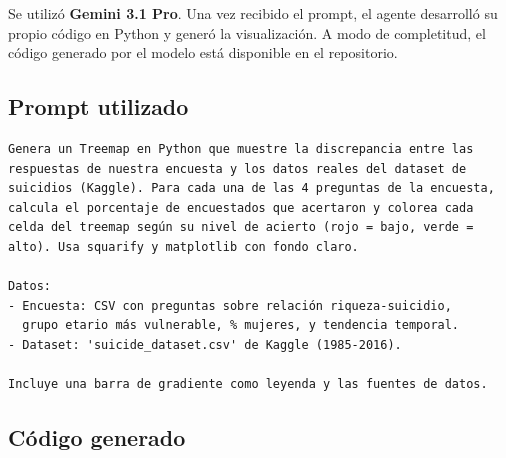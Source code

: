 \documentclass[12pt, letterpaper]{article}
\begin{document}
Se utilizó \textbf{Gemini 3.1 Pro}. Una vez recibido el prompt, el agente desarrolló su propio código en Python y generó la visualización. A modo de completitud, el código generado por el modelo está disponible en el repositorio.

\subsection{Prompt utilizado}

\begin{lstlisting}[basicstyle=\small\ttfamily, breaklines=true, frame=single]
Genera un Treemap en Python que muestre la discrepancia entre las
respuestas de nuestra encuesta y los datos reales del dataset de
suicidios (Kaggle). Para cada una de las 4 preguntas de la encuesta,
calcula el porcentaje de encuestados que acertaron y colorea cada
celda del treemap según su nivel de acierto (rojo = bajo, verde =
alto). Usa squarify y matplotlib con fondo claro.

Datos:
- Encuesta: CSV con preguntas sobre relación riqueza-suicidio,
  grupo etario más vulnerable, % mujeres, y tendencia temporal.
- Dataset: 'suicide_dataset.csv' de Kaggle (1985-2016).

Incluye una barra de gradiente como leyenda y las fuentes de datos.
\end{lstlisting}

\subsection{Código generado}
\end{document}

